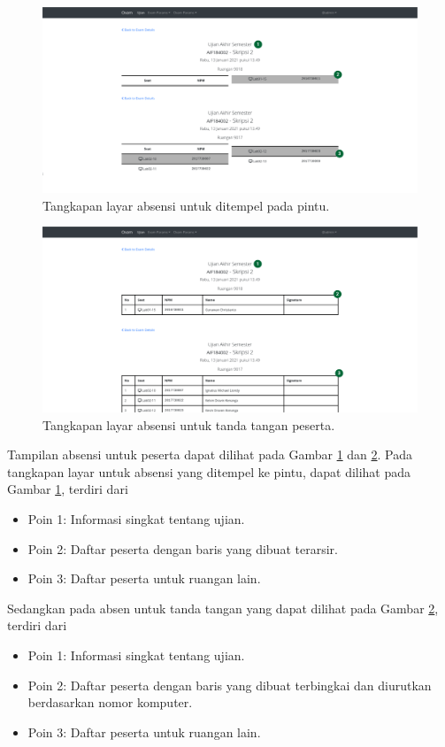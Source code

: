     
    \begin{figure}
        \centering
        \includegraphics[width=0.7\paperwidth]{Gambar/implemented-interface/admin/absen-pintu.png}
        \caption{Tangkapan layar absensi untuk ditempel pada pintu.}
        \label{fig:screenshot-admin-absen-pintu}
    \end{figure}
    \begin{figure}
        \centering
        \includegraphics[width=0.7\paperwidth]{Gambar/implemented-interface/admin/absen-ttd.png}
        \caption{Tangkapan layar absensi untuk tanda tangan peserta.}
        \label{fig:screenshot-admin-absen-ttd}
    \end{figure}
    Tampilan absensi untuk peserta dapat dilihat pada Gambar \ref{fig:screenshot-admin-absen-pintu} dan
    \ref{fig:screenshot-admin-absen-ttd}. Pada tangkapan layar untuk absensi yang ditempel ke pintu,
    dapat dilihat pada Gambar \ref{fig:screenshot-admin-absen-pintu}, terdiri dari
    \begin{itemize}
        \item Poin 1: Informasi singkat tentang ujian.
        \item Poin 2: Daftar peserta dengan baris yang dibuat terarsir. 
        \item Poin 3: Daftar peserta untuk ruangan lain.
    \end{itemize}
    Sedangkan pada absen untuk tanda tangan yang dapat dilihat pada Gambar \ref{fig:screenshot-admin-absen-ttd},
    terdiri dari
    \begin{itemize}
        \item Poin 1: Informasi singkat tentang ujian.
        \item Poin 2: Daftar peserta dengan baris yang dibuat terbingkai dan diurutkan berdasarkan nomor komputer. 
        \item Poin 3: Daftar peserta untuk ruangan lain.
    \end{itemize}
    
